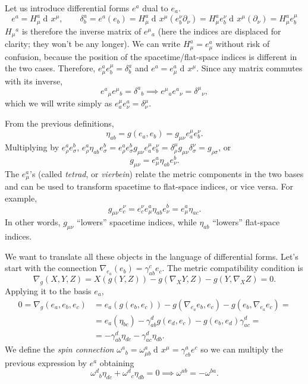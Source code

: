 \documentclass[a4paper,12pt]{book}
\newcommand{\dd}{\mathop{\mathrm{d}\!}{}}
\theoremstyle{definition}
\theoremstyle{remark}
\begin{document}
Let us introduce differential forms $e^a$ dual to $e_a$.
\[e^a=H_\mu^a\dd x^\mu,\qquad \delta^a_b=e^a(e_b)=H_\mu^a\dd x^\mu(e_b^\nu\partial_\nu)=H_\mu^ae_b^\nu\dd x^\mu(\partial_\nu)=H_\mu^ae_b^\mu\]
$H_\mu{}^a$ is therefore the inverse matrix of $e^\mu{}_a$ (here the indices are displaced for clarity; they won't be any longer). We can write $H_\mu^a=e_\mu^a$ without risk of confusion, because the position of the spacetime/flat-space indices is different in the two cases. Therefore, $e^a_\mu e^\mu_b=\delta^a_b$ and $e^a=e^a_\mu\dd x^\mu$. Since any matrix commutes with its inverse,
\[e^a{}_\mu e^\mu{}_b=\delta^a{}_b\implies e^\mu{}_ae^a{}_\nu=\delta^\mu{}_\nu,\]
which we will write simply as $e^\mu_ae^a_\nu=\delta^\mu_\nu$.

From the previous definitions,
\[\eta_{ab}=g(e_a,e_b)=g_{\mu\nu}e^\mu_ae^\nu_b.\]
Multiplying by $e^a_\rho e^b_\sigma$, $e^a_\rho \eta_{ab} e^b_\sigma=e^a_\rho e^b_\sigma g_{\mu\nu}e^\mu_ae^\nu_b=\delta^\mu_\rho g_{\mu\nu}\delta^\nu_\sigma=g_{\rho\sigma}$, or
\[g_{\mu\nu}=e^a_\mu\eta_{ab}e^b_\nu.\]
The $e^a_\mu$'s (called \emph{tetrad}, or \emph{vierbein}) relate the metric components in the two bases and can be used to transform spacetime to flat-space indices, or vice versa. For example,
\[g_{\mu\nu}e^\nu_c=e^\nu_ce^a_\mu\eta_{ab}e^b_\nu=e^a_\mu\eta_{ac}.\]
In other words, $g_{\mu\nu}$ ``lowers'' spacetime indices, while $\eta_{ab}$ ``lowers'' flat-space indices.

We want to translate all these objects in the language of differential forms. Let's start with the connection
$\nabla_{e_a}(e_b)=\gamma_{ab}^ce_c$. The metric compatibility condition is
\[\nabla_g(X,Y,Z)=X(g(Y,Z))-g(\nabla_XY,Z)-g(Y,\nabla_XZ)=0.\]
Applying it to the basis $e_a$,
\begin{align*}
0=\nabla_g(e_a,e_b,e_c)&=e_a(g(e_b,e_c))-g(\nabla_{e_a}e_b,e_c)-g(e_b,\nabla_{e_a}e_c)=\\
&=e_a(\eta_{bc})-\gamma_{ab}^dg(e_d,e_c)-g(e_b,e_d)\gamma_{ac}^d=\\
&=-\gamma_{ab}^d\eta_{dc}-\gamma_{ac}^d\eta_{db}.
\end{align*}
We define the \emph{spin connection} $\omega^a{}_b=\omega^a_{\mu b}\dd x^\mu=\gamma_{cb}^ae^c$ so we can multiply the previous expression by $e^a$ obtaining
\[\omega^d{}_b\eta_{dc}+\omega^d{}_c\eta_{db}=0\implies \omega^{ab}=-\omega^{ba}.\]
\end{document}
